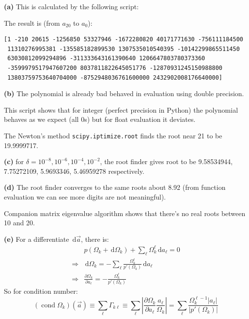 \documentclass[11pt]{article}
\numberwithin{equation}{section} %
\newcommand{\dif}{\,\mathrm d}
\DeclareMathOperator{\cond}{cond}
\begin{document}
\textbf{(a)} This is calculated by the following script: 

The result is (from $a_{20}$ to $a_{0}$):
\begin{lstlisting}[numbers=none]
[1 -210 20615 -1256850 53327946 -1672280820 40171771630 -756111184500
 11310276995381 -135585182899530 1307535010540395 -10142299865511450
 63030812099294896 -311333643161390640 1206647803780373360
 -3599979517947607200 8037811822645051776 -12870931245150988800
 13803759753640704000 -8752948036761600000 2432902008176640000]
\end{lstlisting}

\textbf{(b)} The polynomial is already bad behaved in evaluation using 
double precision. 

This script shows that for integer (perfect precision in Python) the
polynomial behaves as we expect (all 0s) 
but for float evaluation it deviates. 


The Newton's method \texttt{scipy.iptimize.root} finds the root near 21 to 
be 19.9999717. 

\textbf{(c)} for $\delta = 10^{-8}, 10^{-6}, 10^{-4}, 10^{-2}$, 
the root finder gives root to be 9.58534944, 7.75272109, 5.9693346,
5.46959278 respectively.


\textbf{(d)} The root finder converges to the same roots about 8.92 
(from function evaluation we can see more digits are not meaningful). 


Companion matrix eigenvalue algorithm shows that there's no real roots 
between 10 and 20. 

\textbf{(e)} For a differentiate $\dif \vec a$, there is: 
\begin{align}
  &p(\Omega_k + \dif\Omega_k) + \sum_\ell \Omega_k^\ell \dif a_\ell = 0 \\
  \Rightarrow &
  \dif\Omega_k = -\sum_\ell \frac{\Omega_k^\ell}{p'(\Omega_k)} \dif a_\ell \\
  \Rightarrow &
  \frac{\partial\Omega_k}{\partial a_\ell} =
  -\frac{\Omega_k^\ell}{p'(\Omega_k)}
\end{align}
So for condition number: 
\begin{equation}
  (\cond \Omega_k)(\vec a) \equiv \sum_\ell \Gamma_{k\ell} 
  \equiv \sum_\ell \left|\frac{\partial\Omega_k}{\partial a_\ell}
  \frac{a_\ell}{\Omega_k}\right| 
  =\sum_\ell \frac{\Omega_k^{\ell-1}|a_\ell|}{|p'(\Omega_k)|}
  \label{eq:condOmega}
\end{equation}
\end{document}
